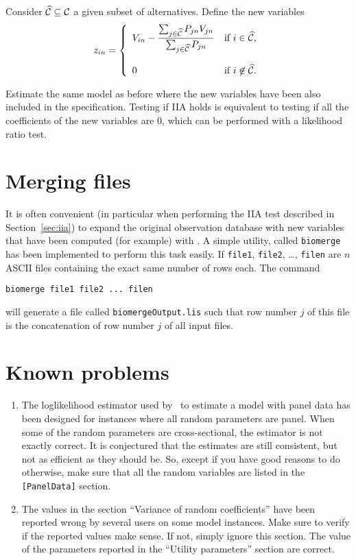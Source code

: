 \documentclass[12pt]{memoir}
\begin{document}
Consider $\widehat{\mathcal{C}} \subseteq \mathcal{C}$ a given subset of alternatives. Define the new variables
\begin{equation}
\label{eq:variablesIIAtest}
z_{in} = \left\{ 
\begin{array}{ll}
\displaystyle V_{in} - \frac{\sum_{j\in \widehat{\mathcal{C}}} P_{jn} V_{jn}}{\sum_{j\in \widehat{\mathcal{C}}} P_{jn}} & \text{if } i \in \widehat{\mathcal{C}}, \\&\\
0 & \text{if } i \not\in \widehat{\mathcal{C}}. 
\end{array}
\right.
\end{equation}

Estimate the same model as before where the new variables have been
also included in the specification.  Testing if IIA holds is
equivalent to testing if all the coefficients of the new variables are 0,
which can be performed with a likelihood ratio test.

\section{Merging files}
\label{sec:biomerge}

It is often convenient (in particular when performing the IIA test
described in Section~\ref{sec:iia}) to expand the original
observation database with new variables that have been computed (for example) with \BIOSIM. A simple utility, called \texttt{biomerge} has been implemented to perform this task easily. If \texttt{file1}, \texttt{file2}, \ldots, \texttt{filen} are $n$ ASCII files containing the exact same number of rows each. 
The command
{\footnotesize
\begin{verbatim}
biomerge file1 file2 ... filen
\end{verbatim}
}
will generate a file called \texttt{biomergeOutput.lis} such that row number $j$ of this file is the concatenation of row number $j$ of all input files. 


\section{Known problems}

\begin{enumerate}
\item The loglikelihood estimator used by \BIOGEME\ to estimate  a model
with panel data has been designed for instances
where all random parameters are panel. When some of the random parameters
are cross-sectional, the estimator is not exactly correct. It is
conjectured that the estimates are still consistent, but not as
efficient as they should be. 
So, except if you have good reasons to do otherwise,
make sure that all the random
variables are listed in the \verb+[PanelData]+ section.
\item The values in the section ``Variance of random
coefficients'' have been reported wrong by several users on some model
instances. Make sure to verify if the reported values make sense. If not, simply ignore this section. The value of the
parameters reported in the ``Utility parameters'' section are
correct. 
\end{enumerate}
\end{document}

